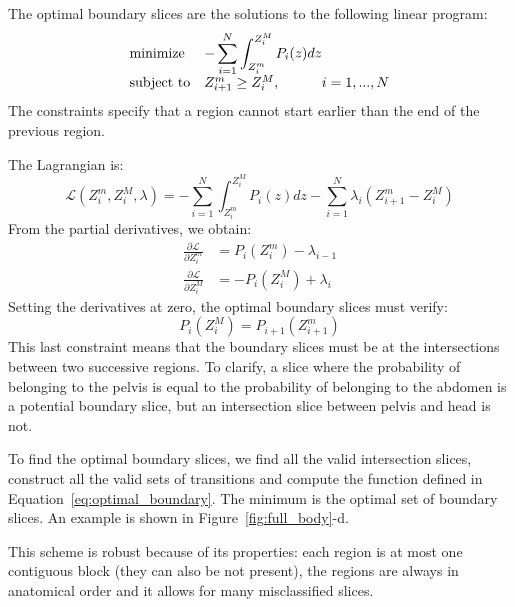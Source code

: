 The optimal boundary slices are the solutions to the following linear program:
\begin{equation}
    \begin{array}{ll@{}ll}
    \text{minimize}  & - \displaystyle\sum\limits_{i=1}^{N} \int_{Z_i^m}^{Z_i^M} P_i(z) dz &\\
    \text{subject to}&  Z^m_{i+1} \ge Z^M_i,  &i=1 ,..., N
    \end{array}
    \label{eq:optimal_boundary}
\end{equation}
The constraints specify that a region cannot start earlier than the end of the previous region.

The Lagrangian is:
\begin{equation}
    \mathcal{L} \left( Z_i^m, Z_i^M, \lambda \right) = - \displaystyle\sum\limits_{i=1}^{N} \int_{Z_i^m}^{Z_i^M} P_i(z) dz
                                                        - \displaystyle\sum\limits_{i=1}^{N} \lambda_i \left( Z^m_{i+1} - Z_i^M \right)
\end{equation}
From the partial derivatives, we obtain:
\begin{align*}
    \frac{\partial \mathcal{L}}{\partial Z_i^m} &= P_i \left( Z_i^m \right) - \lambda_{i-1} \\
    \frac{\partial \mathcal{L}}{\partial Z_i^M} &= - P_i \left( Z_i^M \right) + \lambda_{i}
\end{align*}
Setting the derivatives at zero, the optimal boundary slices must verify:
\begin{equation}
    P_i \left( Z_i^M \right) = P_{i+1} \left( Z_{i+1}^m \right)
\end{equation}
This last constraint means that the boundary slices must be at the intersections between two successive regions. To clarify, a slice where the probability of belonging to the pelvis is equal to the probability of belonging to the abdomen is a potential boundary slice, but an intersection slice between pelvis and head is not.

To find the optimal boundary slices, we find all the valid intersection slices, construct all the valid sets of transitions and compute the function defined in Equation~\ref{eq:optimal_boundary}. The minimum is the optimal set of boundary slices. An example is shown in Figure~\ref{fig:full_body}-d.

This scheme is robust because of its properties: each region is at most one contiguous block (they can also be not present), the regions are always in anatomical order and it allows for many misclassified slices. 

